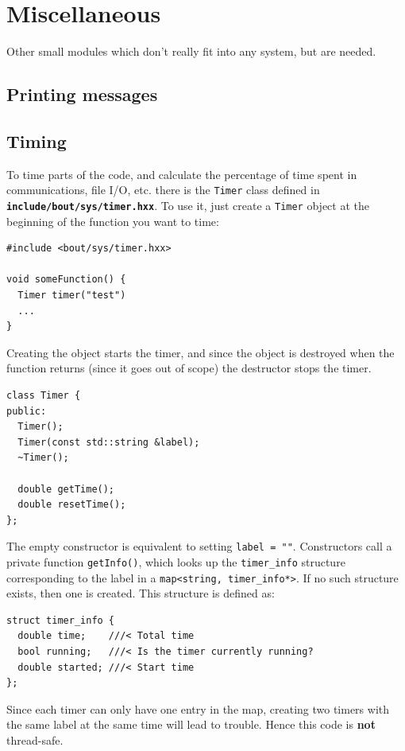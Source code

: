 \documentclass[12pt]{article}
\newcommand{\file}[1]{\texttt{\bf #1}}
\begin{document}
\section{Miscellaneous}

Other small modules which don't really fit into any system, but are needed.


\subsection{Printing messages}


\subsection{Timing}
\label{sec:timerclass}

To time parts of the code, and calculate the percentage of time spent in communications, file I/O, etc. there is the \lstinline!Timer! class defined
in \file{include/bout/sys/timer.hxx}. To use it, just create a \lstinline!Timer!
object at the beginning of the function you want to time:
\begin{lstlisting}
#include <bout/sys/timer.hxx>

void someFunction() {
  Timer timer("test")
  ...
}
\end{lstlisting}
Creating the object starts the timer, and since the object is destroyed when
the function returns (since it goes out of scope) the destructor stops
the timer.
\begin{lstlisting}
class Timer {
public:
  Timer();
  Timer(const std::string &label);
  ~Timer();

  double getTime();
  double resetTime();
};
\end{lstlisting}
The empty constructor is equivalent to setting \lstinline!label = ""!. 
Constructors call a private function \lstinline!getInfo()!, which looks
up the \lstinline!timer_info! structure corresponding to the label in 
a \lstinline!map<string, timer_info*>!. If no such structure exists, then one
is created. This structure is defined as:
\begin{lstlisting}
struct timer_info {
  double time;    ///< Total time
  bool running;   ///< Is the timer currently running?
  double started; ///< Start time
};
\end{lstlisting}
Since each timer can only have one entry in the map, creating two
timers with the same label at the same time will lead to trouble. 
Hence this code is {\bf not} thread-safe.
\end{document}
